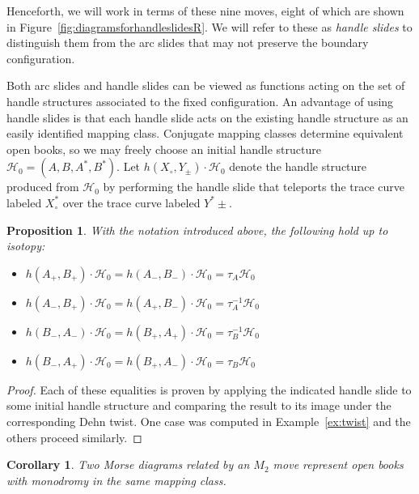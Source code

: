 \documentclass{amsart}
\newtheorem{corollary}[theorem]{Corollary}
\newtheorem{proposition}[theorem]{Proposition}
\theoremstyle{definition}
\def\H{\mathcal{H}}
\begin{document}
Henceforth, we will work in terms of these nine  moves, eight of which are shown in Figure~\ref{fig:diagramsforhandleslidesR}. We will refer to these as \emph{handle slides} to distinguish them from the arc slides that may not preserve the boundary configuration.   

Both arc slides and  handle slides can be viewed as functions acting on the set of handle structures associated to the fixed configuration.  An advantage of using handle slides is that each handle slide acts on the existing handle structure as an easily identified mapping class.   Conjugate mapping classes determine equivalent open books, so   we may freely choose an  initial handle structure $\H_0=(A, B, A^*, B^*)$.  Let $h(X_\circ, Y_\pm)\cdot \H_0$ denote the handle structure produced from $\mathcal{H_0}$ by performing the handle slide that teleports the trace curve labeled $X^*_\circ$ over the trace curve labeled $Y^*\pm$.  



\begin{proposition}\label{lem:runoffedge}
    With the notation introduced above,  the following hold up to isotopy:
   \begin{itemize}
              \item $ h(A_+,B_+)\cdot\H_0=h(A_-,B_-)\cdot\H_0=\tau_A\H_0$
        
         \item $ h(A_-,B_+)\cdot\H_0=h(A_+,B_-)\cdot\H_0=\tau_A^{-1}\H_0$

    \item $h(B_-,A_-)\cdot\H_0=h(B_+,A_+)\cdot\H_0=\tau_B^{-1}\H_0$
    \item $ h(B_-,A_+)\cdot\H_0=h(B_+,A_-)\cdot\H_0=\tau_B\H_0$
\end{itemize}
\end{proposition}


\begin{proof}
Each of these  equalities is proven by applying the indicated handle slide to some initial handle structure and comparing the result to its image under the corresponding Dehn twist.  One case was computed in Example~\ref{ex:twist} and the others proceed similarly.  
\end{proof}

\begin{corollary}\label{cor:1} Two Morse diagrams related by an $M_2$ move represent open books with monodromy in the same mapping class. 
\end{corollary}
\end{document}
